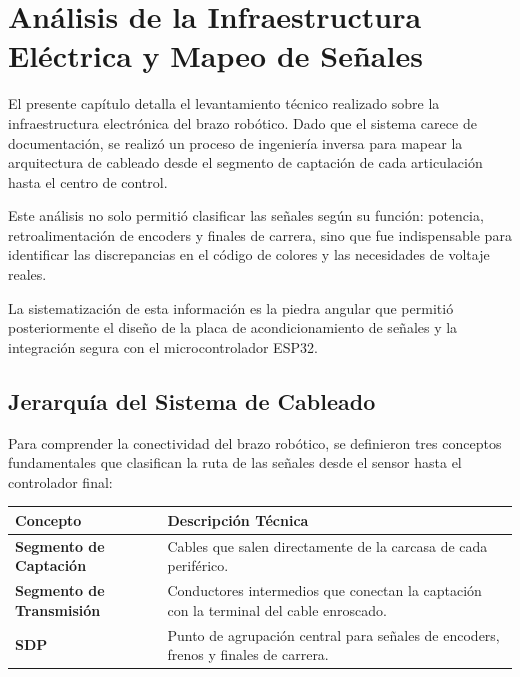 \chapter{Análisis de la Infraestructura Eléctrica y Mapeo de Señales}
\lineaLateral

\begin{resumenCapitulo}
	El presente capítulo detalla el levantamiento técnico realizado sobre la infraestructura electrónica del brazo robótico. Dado que el sistema carece de documentación, se realizó un proceso de ingeniería inversa para mapear la arquitectura de cableado desde el segmento de captación de cada articulación hasta el centro de control. 
	
	Este análisis no solo permitió clasificar las señales según su función: potencia, retroalimentación de encoders y finales de carrera, sino que fue indispensable para identificar las discrepancias en el código de colores y las necesidades de voltaje reales. 
	
	La sistematización de esta información es la piedra angular que permitió posteriormente el diseño de la placa de acondicionamiento de señales y la integración segura con el microcontrolador ESP32.
\end{resumenCapitulo}


\section{Jerarquía del Sistema de Cableado}
Para comprender la conectividad del brazo robótico, se definieron tres conceptos fundamentales que clasifican la ruta de las señales desde el sensor hasta el controlador final:

\renewcommand{\arraystretch}{1.5}
\begin{table}[h]
	\centering
	\begin{tabular}{>{\raggedright\arraybackslash\bfseries}p{4cm} p{10cm}}
		\toprule
		\rowcolor{green!5} Concepto & Descripción Técnica \\ \midrule
		Segmento de Captación & Cables que salen directamente de la carcasa de cada periférico. \\
		Segmento de Transmisión & Conductores intermedios que conectan la captación con la terminal del cable enroscado. \\
		SDP & Punto de agrupación central para señales de encoders, frenos y finales de carrera. \\
		\bottomrule
	\end{tabular}
\end{table}

